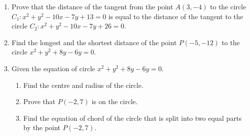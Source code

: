 \documentclass{report}
\begin{document}
\begin{multicols}{2}
\begin{enumerate}
\begin{enumerate}
                  \end{enumerate}
            \item Prove that the distance of the tangent from the point $A(3, -4)$ to the circle
                  $C_1: x^2 + y^2 - 10x - 7y + 13 = 0$ is equal to the distance of the tangent to
                  the circle $C_2: x^2 + y^2 - 10x - 7y + 26 = 0$.
            \item Find the longest and the shortest distance of the point $P(-5, -12)$ to the
                  circle $x^2 + y^2 + 8y - 6y = 0$.
            \item Given the equation of circle $x^2 + y^2 + 8y - 6y = 0$.
                  \begin{enumerate}
                        \item Find the centre and radius of the circle.
                        \item Prove that $P(-2, 7)$ is on the circle.
                        \item Find the equation of chord of the circle that is split into two equal parts by
                              the point $P(-2, 7)$.
                  \end{enumerate}
      \end{enumerate}

\end{multicols}
\end{document}
